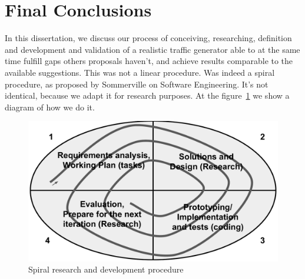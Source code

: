 



\section{Final Conclusions}


In this dissertation, we discuss our process of conceiving, researching, definition and development and validation of a realistic traffic generator able to at the same time fulfill gaps others proposals haven't, and achieve results comparable to the available suggestions. This was not a linear procedure. Was indeed a spiral procedure, as proposed by Sommerville on Software Engineering\cite{sommerville}. It's not identical, because we adapt it for research purposes. At the figure~\ref{fig:spiral} we show a diagram of how we do it. 

\begin{figure}[!ht]
    \centering
    \includegraphics[scale=0.4]{figures/ch6/spiral}
    \caption{Spiral research and development procedure}
    \label{fig:spiral}
\end{figure}


